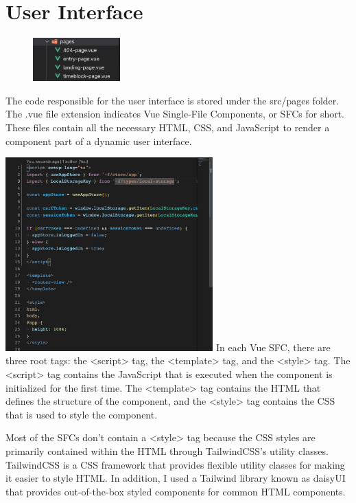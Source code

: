 \documentclass[notitlepage, 12pt]{report}
\begin{document}
\section*{User Interface}
\begin{minipage}{1\textwidth}
	\begin{figure}
		\includegraphics[width=0.3\textwidth]{frontend-pages-folder.png}
	\end{figure}
	The code responsible for the user interface is stored under the src/pages folder. The .vue file extension indicates Vue Single-File Components, or SFCs for short. These files contain all the necessary HTML, CSS, and JavaScript to render a component part of a dynamic user interface.
\end{minipage}

\begin{minipage}{1\textwidth}
	\includegraphics[width=0.6\textwidth]{frontend-vue-sfc.png}
	In each Vue SFC, there are three root tags: the <script> tag, the <template> tag, and the <style> tag. The <script> tag contains the JavaScript that is executed when the component is initialized for the first time. The <template> tag contains the HTML that defines the structure of the component, and the <style> tag contains the CSS that is used to style the component.
\end{minipage}

Most of the SFCs don’t contain a <style> tag because the CSS styles are primarily contained within the HTML through TailwindCSS’s utility classes. TailwindCSS is a CSS framework that provides flexible utility classes for making it easier to style HTML. In addition, I used a Tailwind library known as daisyUI that provides out-of-the-box styled components for common HTML components.
\end{document}
